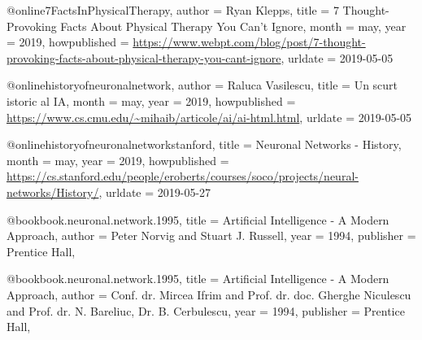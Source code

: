  
 @online{7FactsInPhysicalTherapy,
  author = {Ryan Klepps},
  title = {7 Thought-Provoking Facts About Physical Therapy You Can't Ignore},
  month = may,
  year = {2019},
  howpublished = {\url{https://www.webpt.com/blog/post/7-thought-provoking-facts-about-physical-therapy-you-cant-ignore}},
  urldate = {2019-05-05}
}

 @online{historyofneuronalnetwork,
  author = {Raluca Vasilescu},
  title = {Un scurt istoric al IA},
  month = may,
  year = {2019},
  howpublished = {\url{https://www.cs.cmu.edu/~mihaib/articole/ai/ai-html.html}},
  urldate = {2019-05-05}
}


 @online{historyofneuronalnetworkstanford,
  title = {Neuronal Networks - History},
  month = may,
  year = {2019},
  howpublished = {\url{https://cs.stanford.edu/people/eroberts/courses/soco/projects/neural-networks/History/}},
  urldate = {2019-05-27}
}

@book{book.neuronal.network.1995,
  title = {Artificial Intelligence - A Modern Approach},
  author = {Peter Norvig and Stuart J. Russell},
  year = {1994},
  publisher = {Prentice Hall},
}

@book{book.neuronal.network.1995,
  title = {Artificial Intelligence - A Modern Approach},
  author = {Conf. dr. Mircea Ifrim and
   Prof. dr. doc. Gherghe Niculescu and 
   Prof. dr. N. Bareliuc, Dr. B.
 Cerbulescu},
  year = {1994},
  publisher = {Prentice Hall},
}
